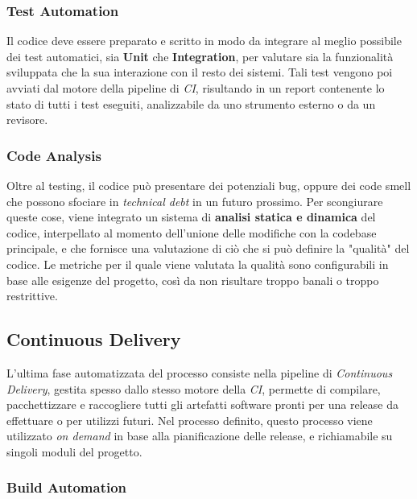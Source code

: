 \documentclass[../main.tex]{subfiles}
\begin{document}
            	\subsubsection{Test Automation}
            	
            	    Il codice deve essere preparato e scritto in modo da integrare al meglio possibile dei test automatici, sia \textbf{Unit} che \textbf{Integration}, per valutare sia la funzionalità sviluppata che la sua interazione con il resto dei sistemi. Tali test vengono poi avviati dal motore della pipeline di \emph{CI}, risultando in un report contenente lo stato di tutti i test eseguiti, analizzabile da uno strumento esterno o da un revisore.
            	
            	\subsubsection{Code Analysis}
            	
            	    Oltre al testing, il codice può presentare dei potenziali bug, oppure dei code smell che possono sfociare in \emph{technical debt} in un futuro prossimo. Per scongiurare queste cose, viene integrato un sistema di \textbf{analisi statica e dinamica} del codice, interpellato al momento dell'unione delle modifiche con la codebase principale, e che fornisce una valutazione di ciò che si può definire la "qualità" del codice. Le metriche per il quale viene valutata la qualità sono configurabili in base alle esigenze del progetto, così da non risultare troppo banali o troppo restrittive.
    	
    	    \subsection{Continuous Delivery}
    	    
    	        L'ultima fase automatizzata del processo consiste nella pipeline di \emph{Continuous Delivery}, gestita spesso dallo stesso motore della \emph{CI}, permette di compilare, pacchettizzare e raccogliere tutti gli artefatti software pronti per una release da effettuare o per utilizzi futuri. Nel processo definito, questo processo viene utilizzato \emph{on demand} in base alla pianificazione delle release, e richiamabile su singoli moduli del progetto.
    	
            	\subsubsection{Build Automation}
            	
\end{document}
